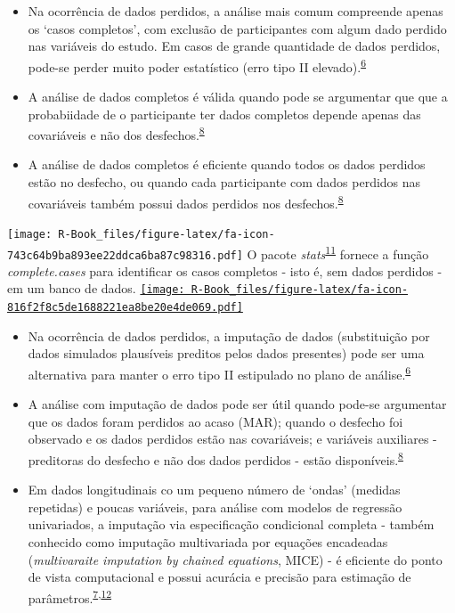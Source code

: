 \documentclass[
]{book}
\begin{document}
\begin{itemize}
\item
  Na ocorrência de dados perdidos, a análise mais comum compreende apenas os `casos completos', com exclusão de participantes com algum dado perdido nas variáveis do estudo. Em casos de grande quantidade de dados perdidos, pode-se perder muito poder estatístico (erro tipo II elevado).\textsuperscript{\protect\hyperlink{ref-Altman2007}{6}}
\item
  A análise de dados completos é válida quando pode se argumentar que que a probabiidade de o participante ter dados completos depende apenas das covariáveis e não dos desfechos.\textsuperscript{\protect\hyperlink{ref-carpenter2021}{8}}
\item
  A análise de dados completos é eficiente quando todos os dados perdidos estão no desfecho, ou quando cada participante com dados perdidos nas covariáveis também possui dados perdidos nos desfechos.\textsuperscript{\protect\hyperlink{ref-carpenter2021}{8}}
\end{itemize}

\texttt{[image: R-Book\_files/figure-latex/fa-icon-743c64b9ba893ee22ddca6ba87c98316.pdf]} O pacote \emph{stats}\textsuperscript{\protect\hyperlink{ref-stats}{11}} fornece a função \emph{complete.cases} para identificar os casos completos - isto é, sem dados perdidos - em um banco de dados. \href{https://stat.ethz.ch/R-manual/R-devel/library/stats/html/stats-package.html}{\texttt{[image: R-Book\_files/figure-latex/fa-icon-816f2f8c5de1688221ea8be20e4de069.pdf]}}

\begin{itemize}
\item
  Na ocorrência de dados perdidos, a imputação de dados (substituição por dados simulados plausíveis preditos pelos dados presentes) pode ser uma alternativa para manter o erro tipo II estipulado no plano de análise.\textsuperscript{\protect\hyperlink{ref-Altman2007}{6}}
\item
  A análise com imputação de dados pode ser útil quando pode-se argumentar que os dados foram perdidos ao acaso (MAR); quando o desfecho foi observado e os dados perdidos estão nas covariáveis; e variáveis auxiliares - preditoras do desfecho e não dos dados perdidos - estão disponíveis.\textsuperscript{\protect\hyperlink{ref-carpenter2021}{8}}
\item
  Em dados longitudinais co um pequeno número de `ondas' (medidas repetidas) e poucas variáveis, para análise com modelos de regressão univariados, a imputação via especificação condicional completa - também conhecido como imputação multivariada por equações encadeadas (\emph{multivaraite imputation by chained equations}, MICE) - é eficiente do ponto de vista computacional e possui acurácia e precisão para estimação de parâmetros.\textsuperscript{\protect\hyperlink{ref-Heymans2022}{7},\protect\hyperlink{ref-Cao2022}{12}}
\end{itemize}
\end{document}
